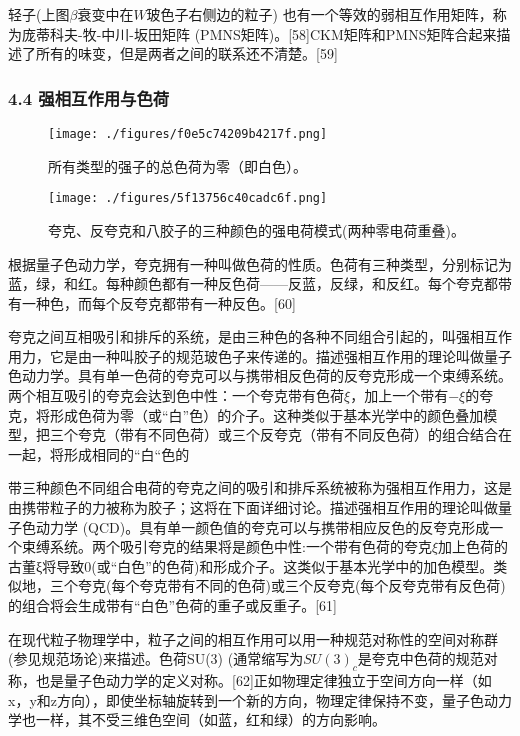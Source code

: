 轻子(上图$\beta$衰变中在$W$玻色子右侧边的粒子) 也有一个等效的弱相互作用矩阵，称为庞蒂科夫-牧-中川-坂田矩阵 (PMNS矩阵)。[58]CKM矩阵和PMNS矩阵合起来描述了所有的味变，但是两者之间的联系还不清楚。[59]

\subsubsection{4.4 强相互作用与色荷}
\begin{figure}[ht]
\centering
\texttt{[image: ./figures/f0e5c74209b4217f.png]}
\caption{所有类型的强子的总色荷为零（即白色）。} \label{fig_Quark_8}
\end{figure}

\begin{figure}[ht]
\centering
\texttt{[image: ./figures/5f13756c40cadc6f.png]}
\caption{夸克、反夸克和八胶子的三种颜色的强电荷模式(两种零电荷重叠)。} \label{fig_Quark_9}
\end{figure}

根据量子色动力学，夸克拥有一种叫做色荷的性质。色荷有三种类型，分别标记为蓝，绿，和红。每种颜色都有一种反色荷——反蓝，反绿，和反红。每个夸克都带有一种色，而每个反夸克都带有一种反色。[60]

夸克之间互相吸引和排斥的系统，是由三种色的各种不同组合引起的，叫强相互作用力，它是由一种叫胶子的规范玻色子来传递的。描述强相互作用的理论叫做量子色动力学。具有单一色荷的夸克可以与携带相反色荷的反夸克形成一个束缚系统。两个相互吸引的夸克会达到色中性：一个夸克带有色荷$\xi$，加上一个带有$-\xi$的夸克，将形成色荷为零（或“白”色）的介子。这种类似于基本光学中的颜色叠加模型，把三个夸克（带有不同色荷）或三个反夸克（带有不同反色荷）的组合结合在一起，将形成相同的“白“色的

带三种颜色不同组合电荷的夸克之间的吸引和排斥系统被称为强相互作用力，这是由携带粒子的力被称为胶子；这将在下面详细讨论。描述强相互作用的理论叫做量子色动力学 (QCD)。具有单一颜色值的夸克可以与携带相应反色的反夸克形成一个束缚系统。两个吸引夸克的结果将是颜色中性:一个带有色荷的夸克$\xi$加上色荷的古董ξ将导致0(或“白色”的色荷)和形成介子。这类似于基本光学中的加色模型。类似地，三个夸克(每个夸克带有不同的色荷)或三个反夸克(每个反夸克带有反色荷)的组合将会生成带有“白色”色荷的重子或反重子。[61]

在现代粒子物理学中，粒子之间的相互作用可以用一种规范对称性的空间对称群(参见规范场论)来描述。色荷SU(3) (通常缩写为$SU(3)_c$是夸克中色荷的规范对称，也是量子色动力学的定义对称。[62]正如物理定律独立于空间方向一样（如x，y和z方向），即使坐标轴旋转到一个新的方向，物理定律保持不变，量子色动力学也一样，其不受三维色空间（如蓝，红和绿）的方向影响。

